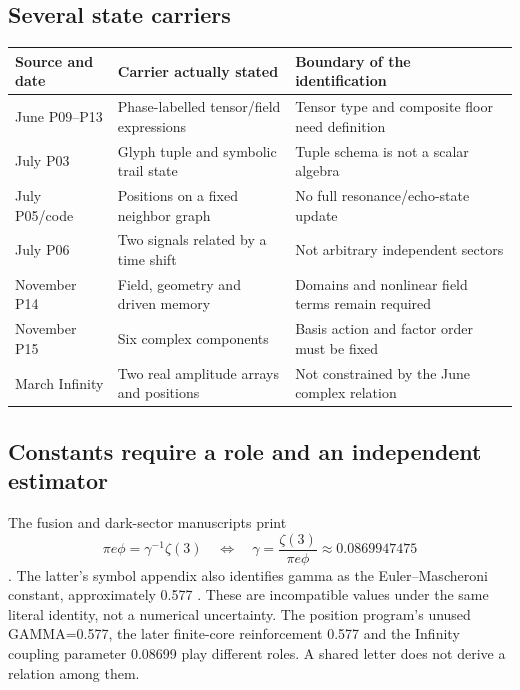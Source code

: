 \documentclass[11pt,a4paper]{article}
\theoremstyle{definition}
\newcommand{\phig}{\phi}
\numberwithin{equation}{section}
\begin{document}
\subsection{Several state carriers}
\begin{center}
\small
\renewcommand{\arraystretch}{1.2}
\begin{tabularx}{\textwidth}{@{}p{}YY@{}}
\toprule
Source and date & Carrier actually stated & Boundary of the identification\\
\midrule
June P09--P13 & Phase-labelled tensor/field expressions &
Tensor type and composite floor need definition\\
July P03 & Glyph tuple and symbolic trail state &
Tuple schema is not a scalar algebra\\
July P05/code & Positions on a fixed neighbor graph &
No full resonance/echo-state update\\
July P06 & Two signals related by a time shift &
Not arbitrary independent sectors\\
November P14 & Field, geometry and driven memory &
Domains and nonlinear field terms remain required\\
November P15 & Six complex components &
Basis action and factor order must be fixed\\
March Infinity & Two real amplitude arrays and positions &
Not constrained by the June complex relation\\
\bottomrule
\end{tabularx}
\end{center}

\subsection{Constants require a role and an independent estimator}

The fusion and dark-sector manuscripts print
\begin{equation}
 \pi e\phig=\gamma^{-1}\zeta(3)
 \quad\Longleftrightarrow\quad
 \gamma=\frac{\zeta(3)}{\pi e\phig}
 \approx0.0869947475
 \label{eq:constant-lock}
\end{equation}
\cite[physical p.~3, Eq.~(1)]{P01}
\cite[physical p.~4, Eq.~(2)]{P06}.
The latter's symbol appendix also identifies gamma as the
Euler--Mascheroni constant, approximately 0.577
\cite[physical p.~6]{P06}. These are incompatible values under the same
literal identity, not a numerical uncertainty.
The position program's unused GAMMA=0.577, the later finite-core
reinforcement 0.577 and the Infinity coupling parameter 0.08699
play different roles. A shared letter does not derive a relation among them.
\end{document}
